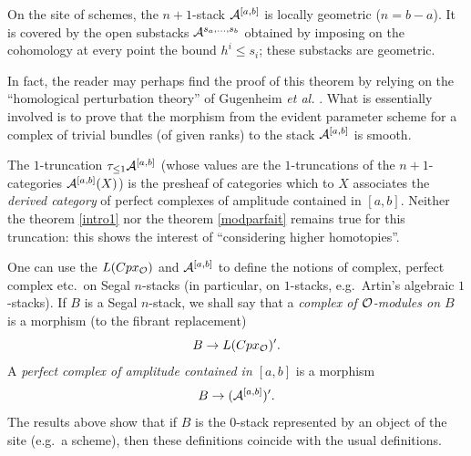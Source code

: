 \begin{theorem}
\label{modparfait}
On the site of schemes,
the $n+1$-stack ${\cal  A}^{[a,b]}$ is locally geometric ($n=b-a$).
It is covered by the open substacks ${\cal  A}^{s_a,\ldots ,s_b}$
obtained by imposing on the cohomology at every point the bound $h^i \leq
s_i$;
these substacks are geometric.
\end{theorem}

In fact, the reader may perhaps find the proof of this
theorem by relying on the ``homological perturbation
theory'' of Gugenheim {\em et al.} \cite{Gugenheim}
\cite{GugenheimLambe}. What is essentially involved is to prove that the
morphism from the evident parameter scheme for a complex of trivial bundles
(of given ranks) to the stack ${\cal  A}^{[a,b]}$ is smooth.



The $1$-truncation $\tau _{\leq 1}{\cal  A}^{[a,b]}$ (whose values
are the $1$-truncations of the $n+1$-categories ${\cal  A}^{[a,b]}(X)$)
is the presheaf of categories which to $X$ associates the {\em derived
category} of perfect complexes of amplitude contained in $[a,b]$. Neither
the theorem \ref{intro1} nor
the theorem \ref{modparfait} remains true for this
truncation: this shows the interest of ``considering higher
homotopies''.

One can use the $L(Cpx _{{\cal O}})$ and ${\cal A}^{[a,b]}$ to define
the notions of complex,
perfect complex etc.\ on Segal $n$-stacks (in particular, on
$1$-stacks, e.g.\ Artin's
algebraic $1$-stacks). If $B$ is a Segal $n$-stack, we
shall say that a {\em complex of
${\cal O}$-modules on $B$} is a morphism (to the fibrant replacement)
$$
B\rightarrow L(Cpx
_{{\cal O}})'.
$$
A {\em perfect complex of amplitude contained in $[a,b]$} is a morphism
$$
B\rightarrow ({\cal A}^{[a,b]})'.
$$
The results above show that if $B$ is the $0$-stack represented
by an object of the site
(e.g.\ a scheme),
then these definitions coincide with the usual definitions.

\newpage
